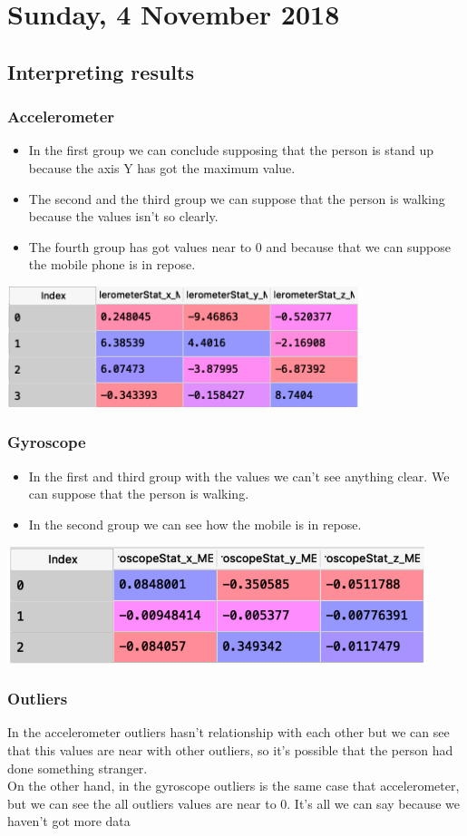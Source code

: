 \section{Sunday, 4 November 2018}

\subsection{Interpreting results}
\subsubsection{Accelerometer}
\begin{itemize}
\item In the first group we can conclude supposing that the person is stand up because the axis Y has got the maximum value.
\item The second and the third group we can suppose that the person is walking because the values isn't so clearly. 
\item The fourth group has got values near to 0 and because that we can suppose the mobile phone is in repose.
\end{itemize}
\includegraphics{images/CentroidsMean_Accelerometer}

\subsubsection{Gyroscope}
\begin{itemize}
\item In the first and third group with the values we can't see anything clear. We can suppose that the person is walking.
\item In the second group we can see how the mobile is in repose.

\end{itemize}
\includegraphics{images/CentroidsMean_Gyroscope}

\subsubsection{Outliers}
In the accelerometer outliers hasn't relationship with each other but we can see that this values are near with other outliers, so it's possible that the person had done something stranger.\\

On the other hand, in the gyroscope outliers is the same case that accelerometer, but we can see the all outliers values are near to 0. It's all we can say because we haven't got more data
